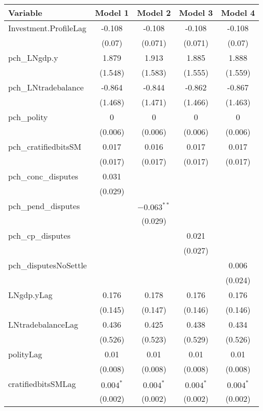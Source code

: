 \begin{table}[ht]
\centering
\begin{tabular}{lcccc}
 Variable & Model 1 & Model 2 & Model 3 & Model 4 \\ 
  \hline
\hline
Investment.ProfileLag & -0.108 & -0.108 & -0.108 & -0.108 \\ 
   & (0.07) & (0.071) & (0.071) & (0.07) \\ 
   \hline
pch\_LNgdp.y & 1.879 & 1.913 & 1.885 & 1.888 \\ 
   & (1.548) & (1.583) & (1.555) & (1.559) \\ 
  pch\_LNtradebalance & -0.864 & -0.844 & -0.862 & -0.867 \\ 
   & (1.468) & (1.471) & (1.466) & (1.463) \\ 
  pch\_polity & 0 & 0 & 0 & 0 \\ 
   & (0.006) & (0.006) & (0.006) & (0.006) \\ 
  pch\_cratifiedbitsSM & 0.017 & 0.016 & 0.017 & 0.017 \\ 
   & (0.017) & (0.017) & (0.017) & (0.017) \\ 
  pch\_conc\_disputes & 0.031 &  &  &  \\ 
   & (0.029) &  &  &  \\ 
  pch\_pend\_disputes &  & $-0.063^{\ast\ast}$ &  &  \\ 
   &  & (0.029) &  &  \\ 
  pch\_cp\_disputes &  &  & 0.021 &  \\ 
   &  &  & (0.027) &  \\ 
  pch\_disputesNoSettle &  &  &  & 0.006 \\ 
   &  &  &  & (0.024) \\ 
   \hline
LNgdp.yLag & 0.176 & 0.178 & 0.176 & 0.176 \\ 
   & (0.145) & (0.147) & (0.146) & (0.146) \\ 
  LNtradebalanceLag & 0.436 & 0.425 & 0.438 & 0.434 \\ 
   & (0.526) & (0.523) & (0.529) & (0.526) \\ 
  polityLag & 0.01 & 0.01 & 0.01 & 0.01 \\ 
   & (0.008) & (0.008) & (0.008) & (0.008) \\ 
  cratifiedbitsSMLag & $0.004^{\ast}$ & $0.004^{\ast}$ & $0.004^{\ast}$ & $0.004^{\ast}$ \\ 
   & (0.002) & (0.002) & (0.002) & (0.002) \\ 

\end{tabular}
\end{table}
